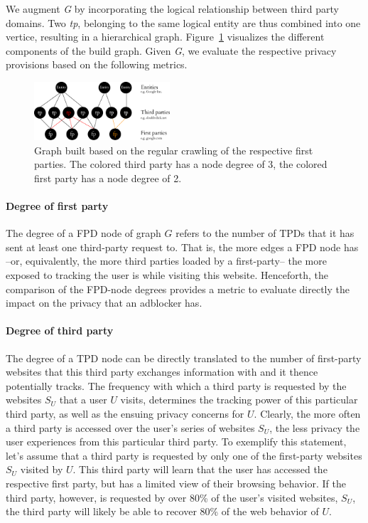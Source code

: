\documentclass{sig-alternate}
\begin{document}
We augment \emph{G} by incorporating the logical relationship between third party domains. Two \emph{tp}, belonging to the same logical entity are thus combined into one vertice, resulting in a hierarchical graph. Figure~\ref{fig:graph} visualizes the different components of the build graph. Given \emph{G}, we evaluate the respective privacy provisions based on the following metrics.

\begin{figure}[htb!]
  \centering
  \includegraphics[width=0.45\textwidth]{figures/graph.eps}
  \caption{Graph built based on the regular crawling of the respective first parties. The colored third party has a node degree of 3, the colored first party has a node degree of 2.}\label{fig:graph}
\end{figure}

\paragraph{Degree of first party}
The degree of a FPD node of graph $G$ refers to the number of TPDs that it has sent at least one third-party request to. That is, the more edges a FPD node has --or, equivalently, the more third parties loaded by a first-party-- the more exposed to tracking the user is while visiting this website. Henceforth, the comparison of the FPD-node degrees provides a metric to evaluate directly the impact on the privacy that an adblocker has.

\paragraph{Degree of third party}
The degree of a TPD node can be directly translated to the number of first-party websites that this third party exchanges information with and it thence potentially tracks. The frequency with which a third party is requested by the websites $S_U$ that a user $U$ visits, determines the tracking power of this particular third party, as well as the ensuing privacy concerns for $U$.
Clearly, the more often a third party is accessed over the user's series of websites $S_U$, the less privacy the user experiences from this particular third party. To exemplify this statement, let's assume that a third party is requested by only one of the first-party websites $S_U$ visited by $U$. This third party will learn that the user has accessed the respective first party, but has a limited view of their browsing behavior. If the third party, however, is requested by over 80\% of the user's visited websites, $S_U$, the third party will likely be able to recover 80\% of the web behavior of $U$.
\end{document}
